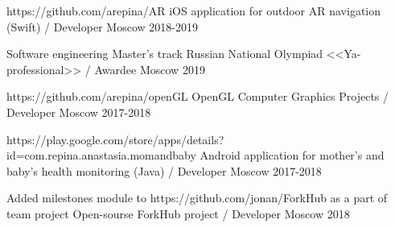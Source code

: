 


\vspace{0cm}\begin{cventries}

\cventry
{https://github.com/arepina/AR} %
{iOS application for outdoor AR navigation  (Swift) / Developer} %
{Moscow} %
{2018-2019} %
{}

\cventry
{Software engineering Master's track} %
{Russian National Olympiad <<Ya-professional>> / Awardee} %
{Moscow} %
{2019} %
{}	
	

\cventry
{https://github.com/arepina/openGL} %
{OpenGL Computer Graphics Projects / Developer} %
{Moscow} %
{2017-2018} %
{}
		
	
\cventry
{https://play.google.com/store/apps/details?id=com.repina.anastasia.momandbaby} %
{Android application for mother's and baby's health monitoring (Java) / Developer} %
{Moscow} %
{2017-2018} %
{}
	

\cventry
{Added milestones module to https://github.com/jonan/ForkHub as a part of team project} %
{Open-sourse ForkHub project / Developer} %
{Moscow} %
{2018} %
{}



\end{cventries}
